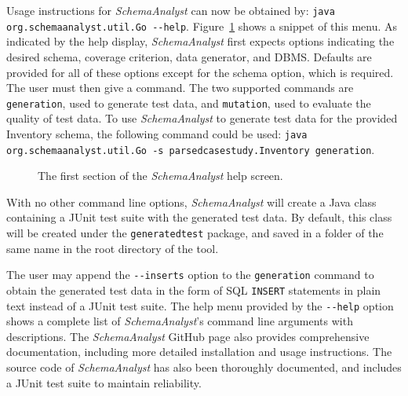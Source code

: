 Usage instructions for \textit{SchemaAnalyst} can now be obtained by: 
\lstinline{java org.schemaanalyst.util.Go --help}. Figure~\ref{fig:usage} shows a snippet of this menu.
As indicated by the help display, \textit{SchemaAnalyst} first expects options indicating the desired
schema, coverage criterion, data generator, and DBMS. Defaults are provided for all of these options
except for the schema option, which is required. The user must then give a command.  The two supported
commands are \lstinline{generation}, used to generate test data, and \lstinline{mutation}, used to
evaluate the quality of test data.
To use \textit{SchemaAnalyst} to generate test data for the provided Inventory schema, the following
command could be used: 
\lstinline{java org.schemaanalyst.util.Go -s parsedcasestudy.Inventory generation}.

\begin{figure}

\caption{\label{fig:usage} The first section of the \textit{SchemaAnalyst} help screen.}
\end{figure}

With no other command line options, \textit{SchemaAnalyst} will create a Java class containing a JUnit test
suite with the generated test data. By default, this class will be created under the \texttt{generatedtest}
package, and saved in a folder of the same name in the root directory of the tool.

The user may append the \lstinline{--inserts} option to the \lstinline{generation} command to obtain the
generated test data in the form of SQL \texttt{INSERT} statements in plain text instead of a JUnit test suite.
The help menu provided by the \lstinline{--help} option shows a complete list of \textit{SchemaAnalyst}'s
command line arguments with descriptions. The \textit{SchemaAnalyst} GitHub page also provides comprehensive
documentation, including more detailed installation and usage instructions. The source code of
\textit{SchemaAnalyst} has also been thoroughly documented, and 
includes a JUnit test suite to maintain reliability.

